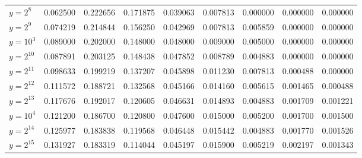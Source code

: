 \documentclass{article}
\theoremstyle{definition}
\begin{document}
\begin{table}[h!]
{\begin{tabular}{l|rrrrrrrr}
            $y = 2^{8}$              & 0.062500 & 0.222656              & 0.171875              & 0.039063              & 0.007813              & 0.000000              & 0.000000              & 0.000000              \\
            $y = 2^{9}$              & 0.074219 & 0.214844              & 0.156250              & 0.042969              & 0.007813              & 0.005859              & 0.000000              & 0.000000              \\
            \hline
            $y = 10^{3}$             & 0.089000 & 0.202000              & 0.148000              & 0.048000              & 0.009000              & 0.005000              & 0.000000              & 0.000000              \\
            \hline
            $y = 2^{10}$             & 0.087891 & 0.203125              & 0.148438              & 0.047852              & 0.008789              & 0.004883              & 0.000000              & 0.000000              \\
            $y = 2^{11}$             & 0.098633 & 0.199219              & 0.137207              & 0.045898              & 0.011230              & 0.007813              & 0.000488              & 0.000000              \\
            $y = 2^{12}$             & 0.111572 & 0.188721              & 0.132568              & 0.045166              & 0.014160              & 0.005615              & 0.001465              & 0.000488              \\
            $y = 2^{13}$             & 0.117676 & 0.192017              & 0.120605              & 0.046631              & 0.014893              & 0.004883              & 0.001709              & 0.001221              \\
            \hline
            $y = 10^{4}$             & 0.121200 & 0.186700              & 0.120800              & 0.047600              & 0.015000              & 0.005200              & 0.001700              & 0.001500              \\
            \hline
            $y = 2^{14}$             & 0.125977 & 0.183838              & 0.119568              & 0.046448              & 0.015442              & 0.004883              & 0.001770              & 0.001526              \\
            $y = 2^{15}$             & 0.131927 & 0.183319              & 0.114044              & 0.045197              & 0.015900              & 0.005219              & 0.002197              & 0.001343              \\

\end{tabular}}
\end{table}
\end{document}
